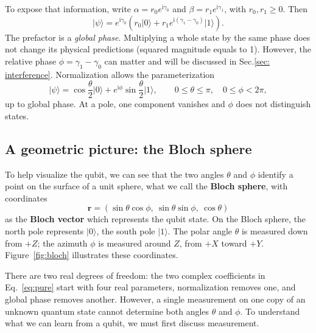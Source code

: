 \documentclass[11pt,a4paper]{article}
\newcommand{\ket}[1]{\lvert #1\rangle}
\newcommand{\ii}{\mathrm{i}}
\begin{document}
To expose that information, write $\alpha=r_0e^{\ii\gamma_0}$ and $\beta=r_1e^{\ii\gamma_1}$, with $r_0,r_1\geq0$. Then
\[
\ket{\psi}=e^{\ii\gamma_0}
\left(r_0\ket{0}+r_1e^{\ii(\gamma_1-\gamma_0)}\ket{1}\right).
\]
The prefactor is a \emph{global phase}. Multiplying a whole state by the same phase does not change its physical predictions (squared magnitude equals to 1). However, the relative phase $\phi=\gamma_1-\gamma_0$ can matter and will be discussed in Sec.\ref{sec: interference}. Normalization allows the parameterization
\begin{equation}\label{eq:blochstate}
\boxed{\ket{\psi}=\cos\frac\theta2\ket{0}
+e^{\ii\phi}\sin\frac\theta2\ket{1}},
\qquad 0\leq\theta\leq\pi,\quad 0\leq\phi<2\pi,
\end{equation}
up to global phase. At a pole, one component vanishes and $\phi$ does not distinguish states.

\subsection{A geometric picture: the Bloch sphere}
To help visualize the qubit, we can see that the two angles $\theta$ and $\phi$ identify a point on the surface of a unit sphere, what we call the \textbf{Bloch sphere}, with coordinates
\begin{equation}
\mathbf r=(\sin\theta\cos\phi,\ \sin\theta\sin\phi,\ \cos\theta)
\end{equation}
as the \textbf{Bloch vector} which represents the qubit state. On the Bloch sphere, the north pole represents $\ket{0}$, the south pole $\ket{1}$. The polar angle $\theta$ is measured down from $+Z$; the azimuth $\phi$ is measured around $Z$, from $+X$ toward $+Y$. Figure~\ref{fig:bloch} illustrates these coordinates.

There are two real degrees of freedom: the two complex coefficients in Eq.~\eqref{eq:pure} start with four real parameters, normalization removes one, and global phase removes another. However, a single measurement on one copy of an unknown quantum state cannot determine both angles \(\theta\) and \(\phi\). To understand what we can learn from a qubit, we must first discuss measurement.
\end{document}
